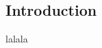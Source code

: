 \documentclass[oneside]{hepthesis}
\begin{document}
  \begin{frontmatter}
    \tableofcontents
  \end{frontmatter}

  \begin{mainmatter}
    \chapter{Introduction}
      lalala
  \end{mainmatter}
\end{document}
